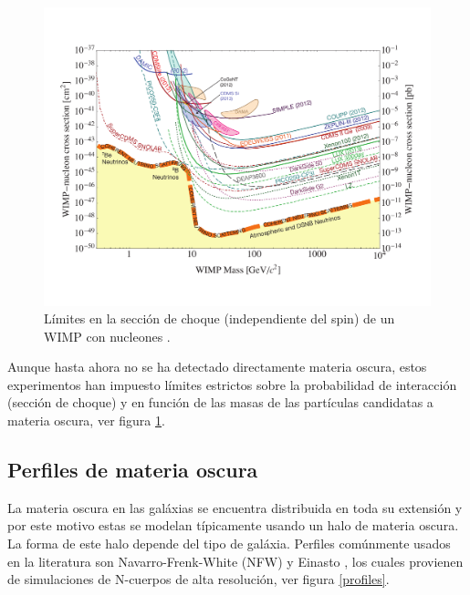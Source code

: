 \begin{figure}[h]
\centering
\includegraphics[scale=0.55]{Images/WIMP-DD.pdf}
\caption[\hspace{0.05in}Límites en la sección de choque de los WIMPs]{Límites en la sección de choque (independiente del spin) de un WIMP con nucleones \cite{Cooley:2014aya}.}
\label{WIMPDD}
\end{figure}

Aunque hasta ahora no se ha detectado directamente materia oscura, estos experimentos han impuesto límites estrictos sobre la probabilidad de interacción (sección de choque) y en función de las masas de las partículas candidatas a materia oscura, ver figura \ref{WIMPDD}. 

\subsection[\hspace{-0.4in}) Perfiles de materia oscura]{Perfiles de materia oscura}
La materia oscura en las galáxias se encuentra distribuida en toda su extensión y por este motivo estas se modelan típicamente usando un halo de materia oscura. La forma de este halo depende del tipo de galáxia. Perfiles comúnmente usados en la literatura son Navarro-Frenk-White (NFW) \cite{Navarro:1995iw} y Einasto \cite{einasto1965kinematics}, los cuales provienen de simulaciones de N-cuerpos de alta resolución, ver figura \ref{profiles}.

